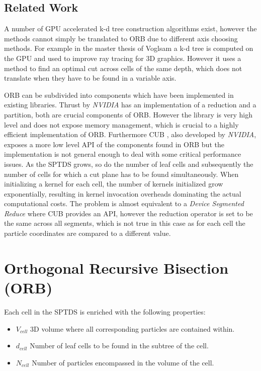 \documentclass[]{article}
\begin{document}
\subsection{Related Work}


A number of GPU accelerated k-d tree construction algorithms exist, however the methods cannot simply be translated to ORB due to different axis choosing methods. For example in the master thesis of Voglsam \cite{rrt} a k-d tree is computed on the GPU and used to improve ray tracing for 3D graphics. However it uses a method to find an optimal cut across cells of the same depth, which does not translate when they have to be found in a variable axis.

ORB can be subdivided into components which have been implemented in existing libraries.
Thrust by \textit{NVIDIA} \cite{thrust} has an implementation of a reduction and a partition, both are crucial components of ORB. However the library is very high level and does not expose memory management, which is crucial to a highly efficient implementation of ORB. 
Furthermore CUB \cite{cub}, also developed by \textit{NVIDIA}, exposes a more low level API of the components found in ORB but the implementation is not general enough to deal with some critical performance issues. As the SPTDS grows, so do the number of leaf cells and subsequently the number of cells for which a cut plane has to be found simultaneously. When initializing a kernel for each cell, the number of kernels initialized grow exponentially, resulting in kernel invocation overheads dominating the actual computational costs. The problem is almost equivalent to a \textit{Device Segmented Reduce} \cite{cubSeg} where CUB provides an API, however the reduction operator is set to be the same across all segments, which is not true in this case as for each cell the particle coordinates are compared to a different value. 


\newpage

\newpage
\section{Orthogonal Recursive Bisection (ORB)} \label{section:orb}


Each cell in the SPTDS is enriched with the following properties:

\begin{itemize}
	\item \textbf{$V_{cell}$} 3D volume where all corresponding particles are contained within.
	\item \textbf{$d_{cell}$} Number of leaf cells to be found in the subtree of the cell.
	\item \textbf{$N_{cell}$} Number of particles encompassed in the volume of the cell. 
\end{itemize}
\end{document}
